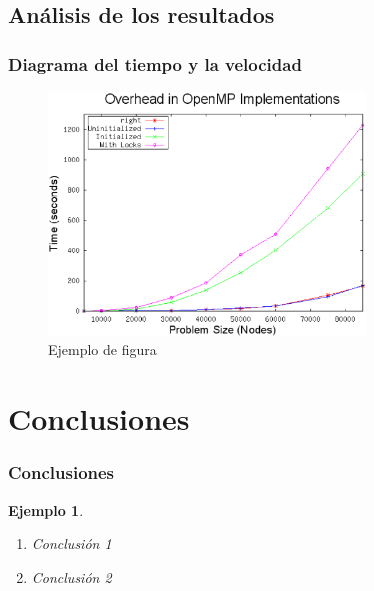 \documentclass{beamer}
\newtheorem{ejemplo}{Ejemplo}
\begin{document}
\subsection{Análisis de los resultados}
\begin{frame}
\frametitle{Diagrama del tiempo y la velocidad}

\begin{figure}[!th]
\begin{center}
\includegraphics[width=0.75\textwidth]{img/figura1.eps}
\caption{Ejemplo de figura}
\label{fig:1}
\end{center}
\end{figure}

\end{frame}


\section{Conclusiones}

\begin{frame}
\frametitle{Conclusiones}

\begin{ejemplo}
  \begin{enumerate}
    \item
      Conclusión 1
      \pause
    \item
      Conclusión 2
  \end{enumerate}
\end{ejemplo}

\end{frame}
\end{document}
